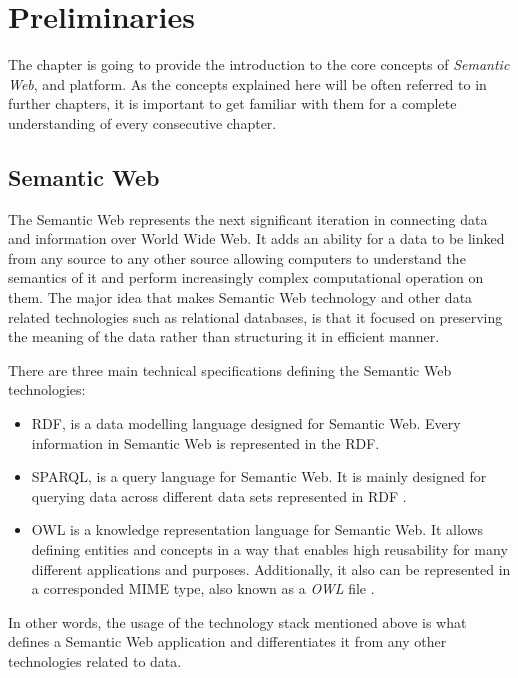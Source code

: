 \chapter{Preliminaries}
\label{chap:num_1}

The chapter is going to provide the introduction to the core concepts of \textit{Semantic Web}, \solid{} and \lpa{} platform. As the concepts explained here will be often referred to in further chapters, it is important to get familiar with them for a complete understanding of every consecutive chapter. 

\section{Semantic Web}
\label{sssec:semantic_web_intro}

The Semantic Web represents the next significant iteration in connecting data and information over World Wide Web. It adds an ability for a data to be linked from any source to any other source allowing computers to understand the semantics of it and perform increasingly complex computational operation on them. The major idea that makes Semantic Web technology and other data related technologies such as relational databases, is that it focused on preserving the meaning of the data rather than structuring it in efficient manner. 

There are three main technical specifications defining the Semantic Web technologies:
\begin{itemize}
	\item \acrfull{RDF}, is a data modelling language designed for Semantic Web. Every information in Semantic Web is represented in the RDF.
	\item \acrfull{SPARQL}, is a query language for Semantic Web. It is mainly designed for querying data across different data sets represented in RDF \cite{sparql_main_spec}.
    \item \acrfull{OWL} is a knowledge representation language for Semantic Web. It allows defining entities and concepts in a way that enables high reusability for many different applications and purposes. Additionally, it also can be represented in a corresponded \acrfull{MIME} type, also known as a \textit{OWL} file \cite{owl}.
\end{itemize}  

In other words, the usage of the technology stack mentioned above is what defines a Semantic Web application and differentiates it from any other technologies related to data.

